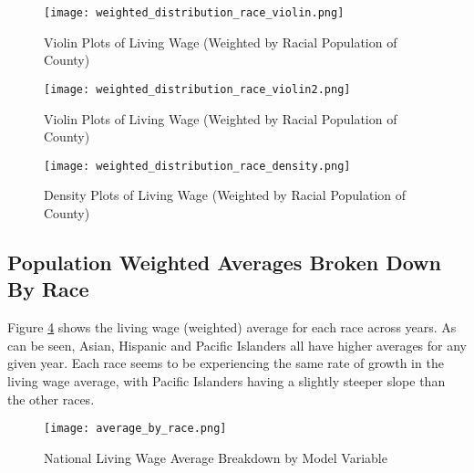 \begin{figure}[H]
    \centering
        \texttt{[image: weighted\_distribution\_race\_violin.png]}
        \caption{Violin Plots of Living Wage (Weighted by Racial Population of County)}
    \label{f:ch4_weighted_distribution_race_violin}
\end{figure}

\begin{figure}[H]
    \centering
        \texttt{[image: weighted\_distribution\_race\_violin2.png]}
        \caption{Violin Plots of Living Wage (Weighted by Racial Population of County)}
    \label{f:ch4_weighted_distribution_race_violin2}
\end{figure}

\begin{figure}[H]
    \centering
        \texttt{[image: weighted\_distribution\_race\_density.png]}
        \caption{Density Plots of Living Wage (Weighted by Racial Population of County)}
    \label{f:ch4_weighted_distribution_race_density}
\end{figure}


\subsection{Population Weighted Averages Broken Down By Race}

Figure \ref{f:ch4_national_avg_variables} shows the living wage (weighted) average for each race across years. As can be seen, Asian, Hispanic and Pacific Islanders all have higher averages for any given year. Each race seems to be experiencing the same rate of growth in the living wage average, with Pacific Islanders having a slightly steeper slope than the other races.

\begin{figure}[hbt]
    \centering
        \texttt{[image: average\_by\_race.png]}
        \caption{National Living Wage Average Breakdown by Model Variable}
    \label{f:ch4_national_avg_variables}
\end{figure}

